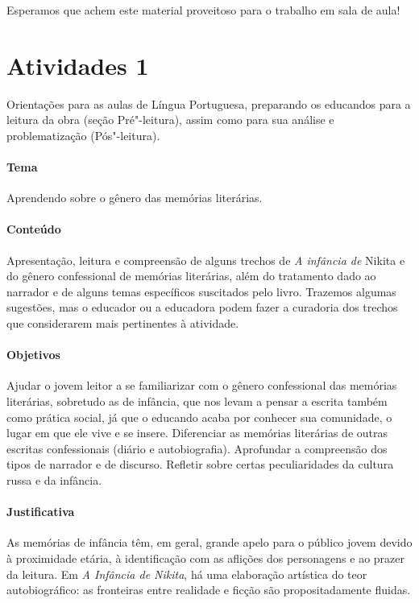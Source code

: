\documentclass{article}
\begin{document}
Esperamos que achem este material proveitoso para o trabalho em sala de
aula!


\section{Atividades 1}

\bnccativividadespreleitura
{}

Orientações para as aulas de Língua Portuguesa, preparando os
educandos para a leitura da obra (seção Pré"-leitura), assim como para
sua análise e problematização (Pós"-leitura).

\paragraph{Tema} Aprendendo sobre o gênero das memórias literárias.

\paragraph{Conteúdo}
Apresentação, leitura e compreensão de alguns trechos de \emph{A
infância de} Nikita e do gênero confessional de memórias literárias,
além do tratamento dado ao narrador e de alguns temas específicos
suscitados pelo livro. Trazemos algumas sugestões, mas o educador ou a
educadora podem fazer a curadoria dos trechos que considerarem mais
pertinentes à atividade.

\paragraph{Objetivos}
Ajudar o jovem leitor a se familiarizar com o gênero confessional das
memórias literárias, sobretudo as de infância, que nos levam a pensar a
escrita também como prática social, já que o educando acaba por conhecer
sua comunidade, o lugar em que ele vive e se insere. Diferenciar as
memórias literárias de outras escritas confessionais (diário e
autobiografia). Aprofundar a compreensão dos tipos de narrador e de
discurso. Refletir sobre certas peculiaridades da cultura russa e da
infância.

\paragraph{Justificativa}
As memórias de infância têm, em geral, grande apelo para o público jovem
devido à proximidade etária, à identificação com as aflições dos
personagens e ao prazer da leitura. Em \emph{A Infância de Nikita}, há
uma elaboração artística do teor autobiográfico: as fronteiras entre
realidade e ficção são propositadamente fluidas.
\end{document}
